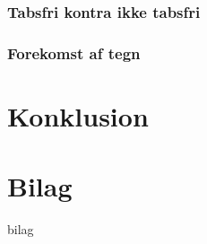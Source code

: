 \documentclass[12pt]{report}
\begin{document}
	\subsection{Tabsfri kontra ikke tabsfri}
	

	\subsection{Forekomst af tegn}
	

\chapter{Konklusion}






\chapter*{Bilag}
 {bilag}
\end{document}
